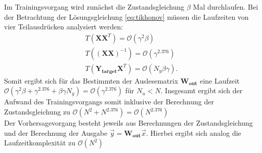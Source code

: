 Im Trainingsvorgang wird zunächst die Zustandsgleichung $\beta$ Mal durchlaufen. Bei der Betrachtung der Lösungsgleichung \ref{eq:tikhonov} müssen die Laufzeiten von vier Teilausdrücken analysiert werden:
\begin{align*}
T\left(\mathbf{X}\mathbf{X}^T \right) = \mathcal{O}(\gamma^2 \beta) \\
T\left((\mathbf{X}\mathbf{X})^{-1} \right) = \mathcal{O}(\gamma^{2.376}) \\
T\left(\mathbf{Y_{target}}\mathbf{X}^T \right) = \mathcal{O}(N_y \beta \gamma).
\end{align*}
Somit ergibt sich für das Bestimmten der Auslesematrix $\mathbf{W_{out}}$ eine Laufzeit $\mathcal{O}(\gamma^2 \beta + \gamma^{2.376} + \beta \gamma N_y) = \mathcal{O}(\gamma^{2.376})$  für $N_u < N$.
Insgesamt ergibt sich der Aufwand des Trainingsvorgangs somit inklusive der Berechnung der Zustandsgleichung zu $\mathcal{O}(N^2 + N^{2.376}) = \mathcal{O}(N^{2.376})$\\

Der Vorhersagevorgang besteht jeweils aus Berechnungen der Zustandsgleichung und der  Berechnung der Ausgabe $\vec{y} = \mathbf{W_{out}} \vec{x}$. Hierbei ergibt sich analog die Laufzeitkomplexität zu $\mathcal{O}(N^2)$\\
